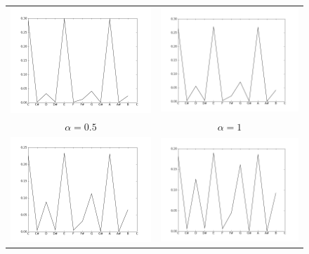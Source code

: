 \begin{figure}[htp]
    \begin{center}
        \begin{tabular}{cc}
        \includegraphics[width=7.5cm]{images/posteriors/posterior-profile-0_5.png} &
        \includegraphics[width=7.5cm]{images/posteriors/posterior-profile-1.png} \\
        $\alpha=0.5$ & $\alpha=1$ \\
        \includegraphics[width=7.5cm]{images/posteriors/posterior-profile-2.png} &
        \includegraphics[width=7.5cm]{images/posteriors/posterior-profile-4.png} \\

\end{tabular}
\end{center}
\end{figure}

